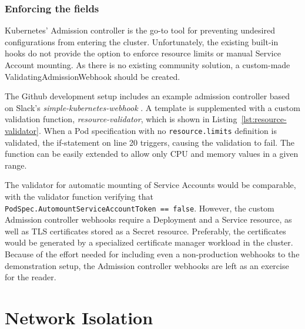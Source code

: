 \documentclass[english, 12pt, a4paper, sci, utf8, a-2b, online]{aaltothesis}
\begin{document}


\subsubsection{Enforcing the fields}

Kubernetes' Admission controller is the go-to tool for preventing undesired configurations from entering the cluster.
Unfortunately, the existing built-in hooks do not provide the option to enforce resource limits or manual Service Account mounting.
As there is no existing community solution, a custom-made ValidatingAdmissionWebhook should be created.

The Github development setup includes an example admission controller based on Slack's \emph{simple-kubernetes-webhook} \cite{simple-kubernetes-webhook}.
A template is supplemented with a custom validation function, \emph{resource-validator}, which is shown in Listing~\ref{lst:resource-validator}.
When a Pod specification with no \texttt{resource.limits} definition is validated, the if-statement on line 20 triggers, causing the validation to fail.
The function can be easily extended to allow only CPU and memory values in a given range.



The validator for automatic mounting of Service Accounts would be comparable, with the validator function verifying that \texttt{PodSpec.AutomountServiceAccountToken == false}.
However, the custom Admission controller webhooks require a Deployment and a Service resource, as well as TLS certificates stored as a Secret resource.
Preferably, the certificates would be generated by a specialized certificate manager workload in the cluster.
Because of the effort needed for including even a non-production webhooks to the demonstration setup, the Admission controller webhooks are left as an exercise for the reader.

\clearpage

\section{Network Isolation} \label{sec:network-solution}
\end{document}
